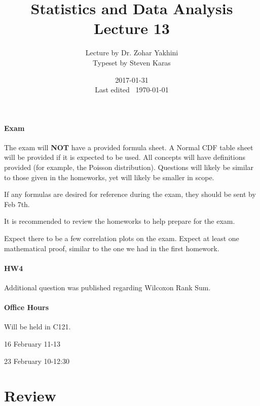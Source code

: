 \documentclass[a4paper]{article}
\title{Statistics and Data Analysis\\\large Lecture 13}
\date{2017-01-31 \\ Last edited \currenttime\ \today}
\author{Lecture by Dr. Zohar Yakhini\\Typeset by Steven Karas}
\newenvironment{itemize*}%
  {\begin{itemize}%
    \setlength{\itemsep}{0pt}%
    \setlength{\parsep}{0pt}%
    \setlength{\parskip}{0pt}}%
  {\end{itemize}}
\begin{document}
\maketitle

\paragraph{Exam}
The exam will \textbf{NOT} have a provided formula sheet.
A Normal CDF table sheet will be provided if it is expected to be used.
All concepts will have definitions provided (for example, the Poisson distribution).
Questions will likely be similar to those given in the homeworks, yet will likely be smaller in scope.

If any formulas are desired for reference during the exam, they should be sent by Feb 7th.

It is recommended to review the homeworks to help prepare for the exam.

Expect there to be a few correlation plots on the exam.
Expect at least one mathematical proof, similar to the one we had in the first homework.

\paragraph{HW4}
Additional question was published regarding Wilcoxon Rank Sum.

\paragraph{Office Hours}

Will be held in C121.

\begin{itemize*}
  \item 16 February 11-13
  \item 23 February 10-12:30
\end{itemize*}

\section{Review}
\end{document}
